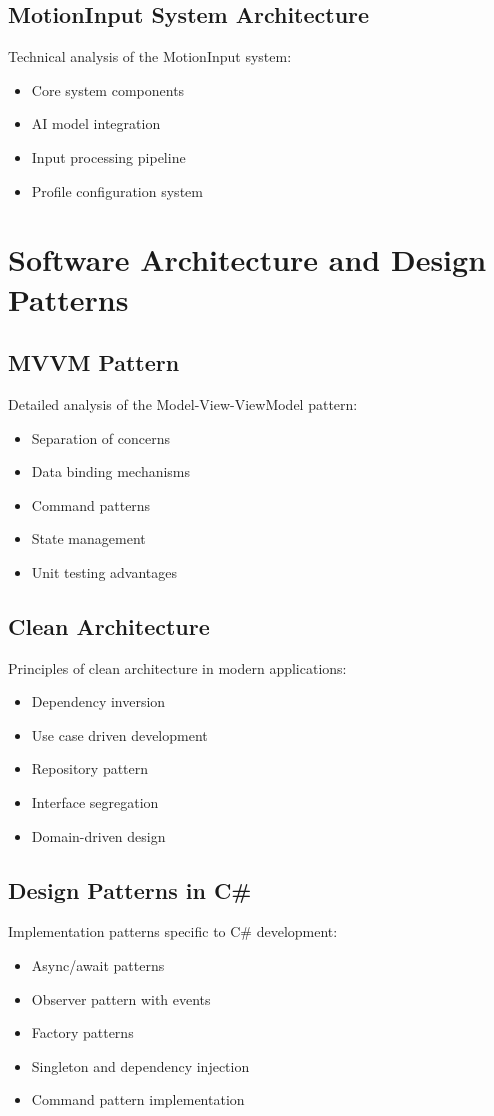 \subsection{MotionInput System Architecture}
Technical analysis of the MotionInput system:
\begin{itemize}
    \item Core system components
    \item AI model integration
    \item Input processing pipeline
    \item Profile configuration system
\end{itemize}

\section{Software Architecture and Design Patterns}
\subsection{MVVM Pattern}
Detailed analysis of the Model-View-ViewModel pattern:
\begin{itemize}
    \item Separation of concerns
    \item Data binding mechanisms
    \item Command patterns
    \item State management
    \item Unit testing advantages
\end{itemize}

\subsection{Clean Architecture}
Principles of clean architecture in modern applications:
\begin{itemize}
    \item Dependency inversion
    \item Use case driven development
    \item Repository pattern
    \item Interface segregation
    \item Domain-driven design
\end{itemize}

\subsection{Design Patterns in C\#}
Implementation patterns specific to C\# development:
\begin{itemize}
    \item Async/await patterns
    \item Observer pattern with events
    \item Factory patterns
    \item Singleton and dependency injection
    \item Command pattern implementation
\end{itemize}

